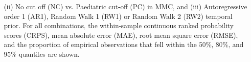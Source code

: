 \documentclass{article}
\begin{document}
\begin{landscape}
{\begin{table}[H]
{    (ii) No cut off (NC) vs. Paediatric cut-off (PC) in MMC, and (iii) 
    Autoregressive order 1 (AR1), Random Walk 1 (RW1) or Random Walk 2 (RW2) 
    temporal prior. For all combinations, the within-sample continuous ranked 
    probability scores (CRPS), mean absolute error (MAE), root mean square 
    error (RMSE), and the proportion of empirical observations that fell within 
    the 50\%, 80\%, and 95\% quantiles are shown.} 
  \label{tab::PPC1VMMC} 
\end{table}} 

\end{landscape}

% 
\end{document}
